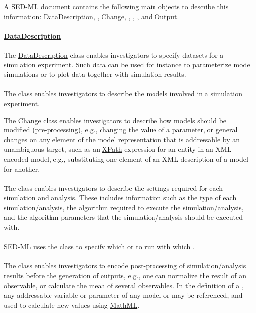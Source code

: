 A \hyperref[class:sed-ml]{SED-ML document} contains the following main objects to describe this information: \hyperref[class:dataDescription]{DataDescription}, \Model, \hyperref[class:change]{Change}, \Simulation, \AbstractTask, \DataGenerator, and \hyperref[class:output]{Output}.

\paragraph*{\hyperref[class:dataDescription]{DataDescription}}
The \hyperref[class:dataDescription]{DataDescription} class enables investigators to specify datasets for a simulation experiment. Such data can be used for instance to parameterize model simulations or to plot data together with simulation results.

\paragraph*{\Model}
The \Model class enables investigators to describe the models involved in a simulation experiment.

The \hyperref[class:change]{Change} class enables investigators to describe how models should be modified (pre-processing), e.g., changing the value of a parameter, or general changes on any element of the model representation that is addressable by an unambiguous target, such as an \hyperref[sec:xpath]{XPath} expression for an entity in an XML-encoded model, e.g., substituting one element of an XML description of a model for another.

\paragraph*{\Simulation}
The \Simulation class enables investigators to describe the settings required for each simulation and analysis. These includes information such as the type of each simulation/analysis, the algorithm required to execute the simulation/analysis, and the algorithm parameters that the simulation/analysis should be executed with.

\paragraph*{\AbstractTask}
SED-ML uses the \AbstractTask class to specify which \Simulation or \FitExperiment to run with which \Model.

\paragraph*{\DataGenerator}
The \DataGenerator class enables investigators to encode post-processing of simulation/analysis results before the generation of outputs, e.g., one can normalize the result of an observable, or calculate the mean of several observables. In the definition of a \DataGenerator, any addressable variable or parameter of any model or \DataSource may be referenced, and used to calculate new values using \hyperref[sec:mathML]{MathML}.

